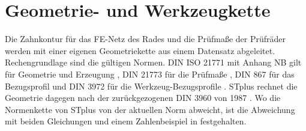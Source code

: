 
\section{Geometrie- und Werkzeugkette}
\label{sec:werkzeugkette}

Die Zahnkontur für das FE-Netz des Rades und die Prüfmaße der Prüfräder werden mit einer eigenen Geometriekette aus einem Datensatz abgeleitet. Rechengrundlage sind die gültigen Normen. DIN ISO 21771 mit Anhang NB gilt für Geometrie und Erzeugung \cite{DINISO21771}, DIN 21773 für die Prüfmaße \cite{DIN21773}, DIN 867 für das Bezugsprofil \cite{DIN867} und DIN 3972 für die Werkzeug-Bezugsprofile \cite{DIN3972}. STplus rechnet die Geometrie dagegen nach der zurückgezogenen DIN 3960 von 1987 \cite{DIN3960}. Wo die Normenkette von STplus von der aktuellen Norm abweicht, ist die Abweichung mit beiden Gleichungen und einem Zahlenbeispiel in  festgehalten.

